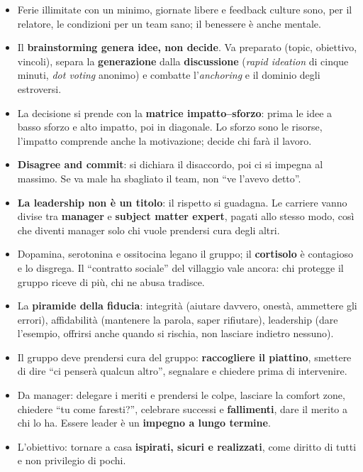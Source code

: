 \begin{itemize}
  \item Ferie illimitate con un minimo, giornate libere e feedback culture sono, per il relatore, le condizioni per un team
        sano; il benessere è anche mentale.
  \item Il \textbf{brainstorming genera idee, non decide}. Va preparato (topic, obiettivo, vincoli), separa la
        \textbf{generazione} dalla \textbf{discussione} (\emph{rapid ideation} di cinque minuti, \emph{dot voting}
        anonimo) e combatte l'\emph{anchoring} e il dominio degli estroversi.
  \item La decisione si prende con la \textbf{matrice impatto--sforzo}: prima le idee a basso sforzo e alto impatto, poi in
        diagonale. Lo sforzo sono le risorse, l'impatto comprende anche la motivazione; decide chi farà il lavoro.
  \item \textbf{Disagree and commit}: si dichiara il disaccordo, poi ci si impegna al massimo. Se va male ha sbagliato il
        team, non ``ve l'avevo detto''.
  \item \textbf{La leadership non è un titolo}: il rispetto si guadagna. Le carriere vanno divise tra \textbf{manager} e
        \textbf{subject matter expert}, pagati allo stesso modo, così che diventi manager solo chi vuole prendersi cura degli
        altri.
  \item Dopamina, serotonina e ossitocina legano il gruppo; il \textbf{cortisolo} è contagioso e lo disgrega. Il
        ``contratto sociale'' del villaggio vale ancora: chi protegge il gruppo riceve di più, chi ne abusa tradisce.
  \item La \textbf{piramide della fiducia}: integrità (aiutare davvero, onestà, ammettere gli errori), affidabilità
        (mantenere la parola, saper rifiutare), leadership (dare l'esempio, offrirsi anche quando si rischia, non lasciare
        indietro nessuno).
  \item Il gruppo deve prendersi cura del gruppo: \textbf{raccogliere il piattino}, smettere di dire ``ci penserà qualcun
        altro'', segnalare e chiedere prima di intervenire.
  \item Da manager: delegare i meriti e prendersi le colpe, lasciare la comfort zone, chiedere ``tu come faresti?'',
        celebrare successi e \textbf{fallimenti}, dare il merito a chi lo ha. Essere leader è un \textbf{impegno a lungo
        termine}.
  \item L'obiettivo: tornare a casa \textbf{ispirati, sicuri e realizzati}, come diritto di tutti e non privilegio di pochi.
\end{itemize}
